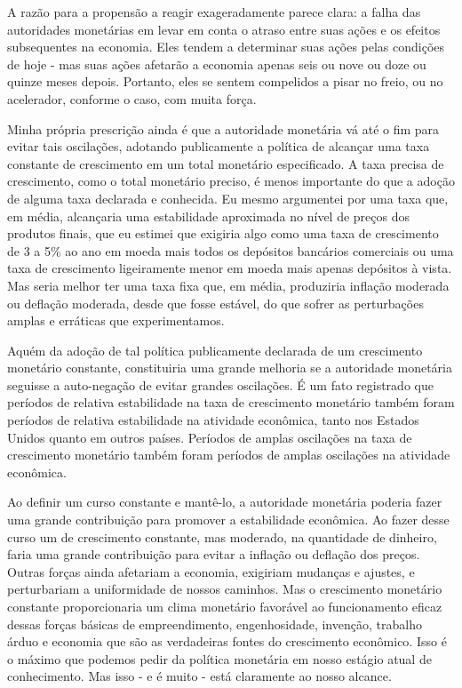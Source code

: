 \documentclass[a4paper,12pt]{article}[abntex2]
\begin{document}
A razão para a propensão a reagir exageradamente parece clara: a falha das autoridades monetárias em levar em conta o atraso entre suas ações e os efeitos subsequentes na economia. Eles tendem a determinar suas ações pelas condições de hoje - mas suas ações afetarão a economia apenas seis ou nove ou doze ou quinze meses depois. Portanto, eles se sentem compelidos a pisar no freio, ou no acelerador, conforme o caso, com muita força.

Minha própria prescrição ainda é que a autoridade monetária vá até o fim para evitar tais oscilações, adotando publicamente a política de alcançar uma taxa constante de crescimento em um total monetário especificado. A taxa precisa de crescimento, como o total monetário preciso, é menos importante do que a adoção de alguma taxa declarada e conhecida. Eu mesmo argumentei por uma taxa que, em média, alcançaria uma estabilidade aproximada no nível de preços dos produtos finais, que eu estimei que exigiria algo como uma taxa de crescimento de 3 a 5\% ao ano em moeda mais todos os depósitos bancários comerciais ou uma taxa de crescimento ligeiramente menor em moeda mais apenas depósitos à vista. Mas seria melhor ter uma taxa fixa que, em média, produziria inflação moderada ou deflação moderada, desde que fosse estável, do que sofrer as perturbações amplas e erráticas que experimentamos.

Aquém da adoção de tal política publicamente declarada de um crescimento monetário constante, constituiria uma grande melhoria se a autoridade monetária seguisse a auto-negação de evitar grandes oscilações. É um fato registrado que períodos de relativa estabilidade na taxa de crescimento monetário também foram períodos de relativa estabilidade na atividade econômica, tanto nos Estados Unidos quanto em outros países. Períodos de amplas oscilações na taxa de crescimento monetário também foram períodos de amplas oscilações na atividade econômica.

Ao definir um curso constante e mantê-lo, a autoridade monetária poderia fazer uma grande contribuição para promover a estabilidade econômica. Ao fazer desse curso um de crescimento constante, mas moderado, na quantidade de dinheiro, faria uma grande contribuição para evitar a inflação ou deflação dos preços. Outras forças ainda afetariam a economia, exigiriam mudanças e ajustes, e perturbariam a uniformidade de nossos caminhos. Mas o crescimento monetário constante proporcionaria um clima monetário favorável ao funcionamento eficaz dessas forças básicas de empreendimento, engenhosidade, invenção, trabalho árduo e economia que são as verdadeiras fontes do crescimento econômico. Isso é o máximo que podemos pedir da política monetária em nosso estágio atual de conhecimento. Mas isso - e é muito - está claramente ao nosso alcance.
\end{document}
